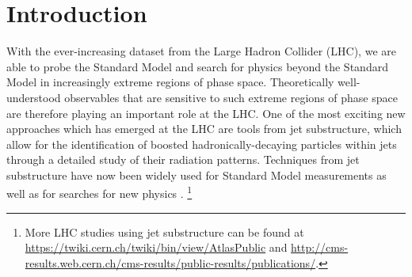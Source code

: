 \documentclass[11pt,letterpaper]{article}
\begin{document}
\maketitle

\section{Introduction}\label{sec:intro}



With the ever-increasing dataset from the Large Hadron Collider (LHC), we are able to probe the Standard Model and search for physics beyond the Standard Model in increasingly extreme regions of phase space.
%
Theoretically well-understood observables that are sensitive to such extreme regions of phase space are therefore playing an important role at the LHC.
%
One of the most exciting new approaches which has emerged at the LHC are tools from jet substructure, which allow for the identification of boosted hadronically-decaying particles within jets through a detailed study of their radiation patterns.
%
Techniques from jet substructure have now been widely used for Standard Model measurements \cite{Chatrchyan:2012sn,CMS:2013cda,Aad:2015cua,Aad:2015lxa,ATLAS-CONF-2015-035,Aad:2015rpa,Aad:2015hna,ATLAS-CONF-2016-002,ATLAS-CONF-2016-039,ATLAS-CONF-2016-034,CMS-PAS-TOP-16-013,CMS-PAS-HIG-16-004} as well as for searches for new physics  \cite{CMS:2011bqa,Fleischmann:2013woa,Pilot:2013bla,TheATLAScollaboration:2013qia,Chatrchyan:2012ku,CMS-PAS-B2G-14-001,CMS-PAS-B2G-14-002,Khachatryan:2015axa,Khachatryan:2015bma,Aad:2015owa,Aaboud:2016okv,Aaboud:2016trl,Aaboud:2016qgg,ATLAS-CONF-2016-055,ATLAS-CONF-2015-071,ATLAS-CONF-2015-068,CMS-PAS-EXO-16-037,CMS-PAS-EXO-16-040,Khachatryan:2016mdm,CMS-PAS-HIG-16-016,CMS-PAS-B2G-15-003,CMS-PAS-EXO-16-017}.%
\footnote{More LHC studies using jet substructure can be found at \url{https://twiki.cern.ch/twiki/bin/view/AtlasPublic} and \url{http://cms-results.web.cern.ch/cms-results/public-results/publications/}.} 
\end{document}
